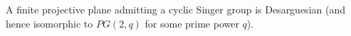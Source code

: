 A finite projective plane admitting a cyclic Singer group is Desarguesian (and hence isomorphic to $PG(2,q)$ for some prime power $q$).
